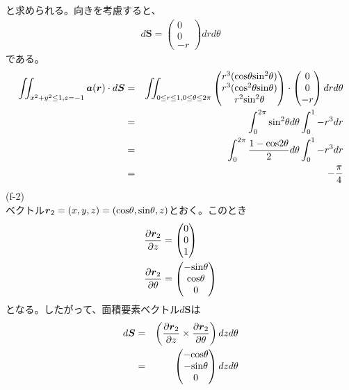 \documentclass[pdflatex,ja=standard,fleqn]{bxjsarticle}
\begin{document}
と求められる。向きを考慮すると、
\begin{eqnarray*}
    d\boldsymbol{S}=\begin{pmatrix}0\\0\\-r\end{pmatrix}drd\theta
\end{eqnarray*}
である。
\begin{eqnarray*}
    \iint_{x^2+y^2\leq 1,z=-1} \boldsymbol{a}(\boldsymbol{r})\cdot d\boldsymbol{S}&=&\iint_{0\leq r\leq1,0\leq\theta\leq 2\pi} \begin{pmatrix}r^3({\rm cos}\theta{\rm sin^2}\theta)\\r^3({\rm cos^2}\theta{\rm sin}\theta)\\r^2{\rm sin^2}\theta\end{pmatrix}\cdot\begin{pmatrix}0\\0\\-r\end{pmatrix}drd\theta\\
    &=&\int_{0}^{2\pi} {\rm sin^2}\theta d\theta \int_{0}^{1} -r^3dr\\
    &=&\int_{0}^{2\pi} \frac{1-{\rm cos}2\theta}{2} d\theta\int_{0}^{1} -r^3dr\\
    &=&-\frac{\pi}{4}
\end{eqnarray*}
(f-2)\\
ベクトル$\boldsymbol{r}_{2}=(x,y,z)=({\rm cos}\theta,{\rm sin}\theta,z)$とおく。このとき
\begin{align*}
    &\frac{\partial \boldsymbol{r}_{2}}{\partial z}=\begin{pmatrix}0\\0\\1\end{pmatrix}\\
    &\frac{\partial \boldsymbol{r}_{2}}{\partial \theta}=\begin{pmatrix}-{\rm sin}\theta\\{\rm cos}\theta\\0\end{pmatrix}
\end{align*}
となる。したがって、面積要素ベクトル$d\boldsymbol{S}$は
\begin{eqnarray*}
    d\boldsymbol{S}&=&\left(\frac{\partial \boldsymbol{r}_{2}}{\partial z}\times\frac{\partial \boldsymbol{r}_{2}}{\partial \theta}\right)dzd\theta\\
    &=&\begin{pmatrix}-{\rm cos}\theta\\-{\rm sin}\theta\\0\end{pmatrix}dzd\theta
\end{eqnarray*}
\end{document}
